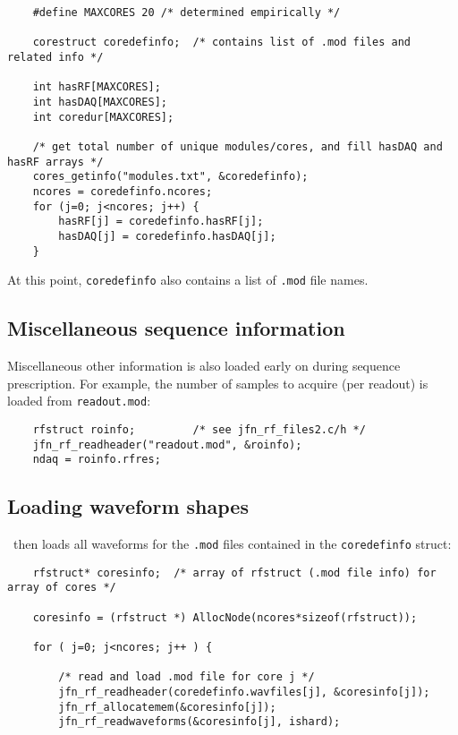 \begin{lstlisting}
	#define MAXCORES 20 /* determined empirically */

	corestruct coredefinfo;  /* contains list of .mod files and related info */

	int hasRF[MAXCORES]; 
	int hasDAQ[MAXCORES];
	int coredur[MAXCORES];

	/* get total number of unique modules/cores, and fill hasDAQ and hasRF arrays */
	cores_getinfo("modules.txt", &coredefinfo);
	ncores = coredefinfo.ncores;
	for (j=0; j<ncores; j++) {
		hasRF[j] = coredefinfo.hasRF[j];
		hasDAQ[j] = coredefinfo.hasDAQ[j];
	}

\end{lstlisting}

At this point, {\tt coredefinfo} also contains a list of {\tt .mod} file names.


\subsection{Miscellaneous sequence information}

Miscellaneous other information is also loaded early on during sequence prescription. 
For example, the number of samples to acquire (per readout) is loaded from {\tt readout.mod}:

\begin{lstlisting}
	rfstruct roinfo;         /* see jfn_rf_files2.c/h */
	jfn_rf_readheader("readout.mod", &roinfo);
	ndaq = roinfo.rfres;
\end{lstlisting}


\subsection{Loading waveform shapes}

\toppe~then loads all waveforms for the {\tt .mod} files contained in the {\tt coredefinfo} struct:

\begin{lstlisting}
	rfstruct* coresinfo;  /* array of rfstruct (.mod file info) for array of cores */

	coresinfo = (rfstruct *) AllocNode(ncores*sizeof(rfstruct));

	for ( j=0; j<ncores; j++ ) {

		/* read and load .mod file for core j */
		jfn_rf_readheader(coredefinfo.wavfiles[j], &coresinfo[j]);
		jfn_rf_allocatemem(&coresinfo[j]);     
		jfn_rf_readwaveforms(&coresinfo[j], ishard);

\end{lstlisting}

